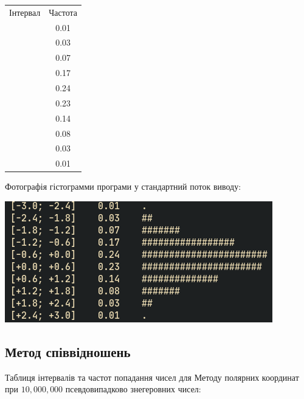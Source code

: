 \documentclass[a4paper,12pt]{report}
\begin{document}
\begin{table}[ht]
\centering %
\begin{tabular}{c c} %
  Інтервал & Частота \\\relax
[-3.0; -2.4] & 0.01 \\\relax
[-2.4; -1.8] & 0.03  \\\relax
[-1.8; -1.2] & 0.07 \\\relax
[-1.2; -0.6] & 0.17 \\\relax
[-0.6; +0.0] & 0.24 \\\relax
[+0.0; +0.6] & 0.23 \\\relax
[+0.6; +1.2] & 0.14 \\\relax
[+1.2; +1.8] & 0.08 \\\relax
[+1.8; +2.4] & 0.03 \\\relax
[+2.4; +3.0] & 0.01
\end{tabular}
\end{table}
Фотографія гістограмми програми у стандартний поток виводу:
\begin{center}\includegraphics[scale=0.5]{polar}\end{center}



\subsection{Метод співвідношень}
Таблиця інтервалів та частот попадання чисел для Методу полярних координат при $10,000,000$ псевдовипадково знегеровних чисел:
\end{document}
